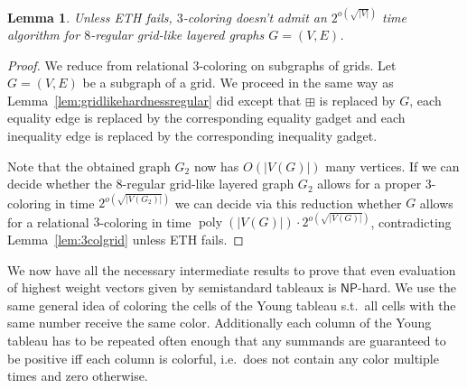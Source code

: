\documentclass[10pt,a4paper]{article}
\numberwithin{equation}{section}
\newtheorem{lemma}[equation]{Lemma}
\theoremstyle{definition}
\newcommand{\NP}{\ensuremath{\mathsf{NP}}}
\DeclareMathOperator{\poly}{poly}
\begin{document}
\begin{lemma}
    \label{lem:gridlikeethhardness}
    Unless ETH fails, $3$-coloring doesn't admit an $2^{o\left(\sqrt{|V|}\right)}$ time algorithm for $8$-regular grid-like layered graphs $G = (V, E)$.
\end{lemma}
\begin{proof}
    We reduce from relational $3$-coloring on subgraphs of grids.
    Let $G = (V, E)$ be a subgraph of a grid.
    We proceed in the same way as Lemma~\ref{lem:gridlikehardnessregular} did except that $\boxplus$ is replaced by $G$, each equality edge is replaced by the corresponding equality gadget and each inequality edge is replaced by the corresponding inequality gadget.
    
    Note that the obtained graph $G_2$ now has $O(|V(G)|)$ many vertices.
    If we can decide whether the $8$-regular grid-like layered graph $G_2$ allows for a proper $3$-coloring in time $2^{o\left(\sqrt{|V(G_2)|}\right)}$ we can decide via this reduction whether $G$ allows for a relational $3$-coloring in time $\poly(|V(G)|) \cdot 2^{o\left(\sqrt{|V(G)|}\right)}$, contradicting Lemma~\ref{lem:3colgrid} unless ETH fails.
\end{proof}

We now have all the necessary intermediate results to prove that even evaluation of highest weight vectors given by semistandard tableaux is $\NP$-hard.
We use the same general idea of coloring the cells of the Young tableau s.t.\ all cells with the same number receive the same color.
Additionally each column of the Young tableau has to be repeated often enough that any summands are guaranteed to be positive iff each column is colorful, i.e.\ does not contain any color multiple times and zero otherwise.
\end{document}
